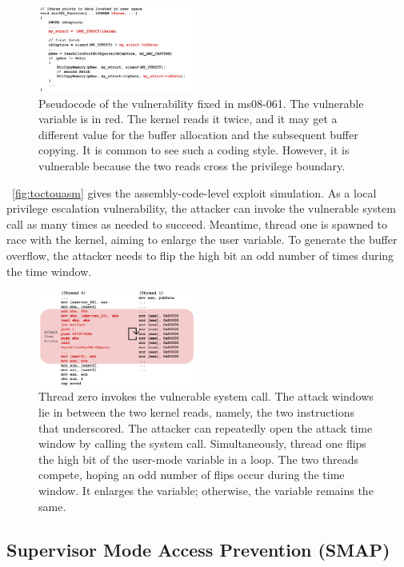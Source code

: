 \begin{figure}[th]
	\includegraphics[width=0.47\textwidth]{figures/code08061}
	\centering
	\caption{Pseudocode of the vulnerability fixed in ms08-061. The vulnerable variable is in red. The kernel reads it twice, and it may get a different value for the buffer allocation and the subsequent buffer copying. It is common to see such a coding style. However, it is vulnerable because the two reads cross the privilege boundary.}
	\label{fig:code08061}
\end{figure}


~\autoref{fig:toctouasm} gives the assembly-code-level exploit simulation.  As a local privilege escalation vulnerability, the attacker can invoke the vulnerable system call as many times as needed to succeed. Meantime, thread one is spawned to race with the kernel, aiming to enlarge the user variable. To generate the buffer overflow, the attacker needs to flip the high bit an odd number of times during the time window.


\begin{figure}[ht]
  \includegraphics[width=0.47\textwidth]{figures/toctouasm3}
  \centering
  \caption{Thread zero invokes the vulnerable system call. The attack windows lie in between the two kernel reads, namely, the two instructions that underscored. The attacker can repeatedly open the attack time window by calling the system call. Simultaneously, thread one flips the high bit of the user-mode variable in a loop. The two threads compete, hoping an odd number of flips occur during the time window. It enlarges the variable; otherwise, the variable remains the same.}
  \label{fig:toctouasm}
\end{figure}



\subsection{Supervisor Mode Access Prevention (SMAP)}

